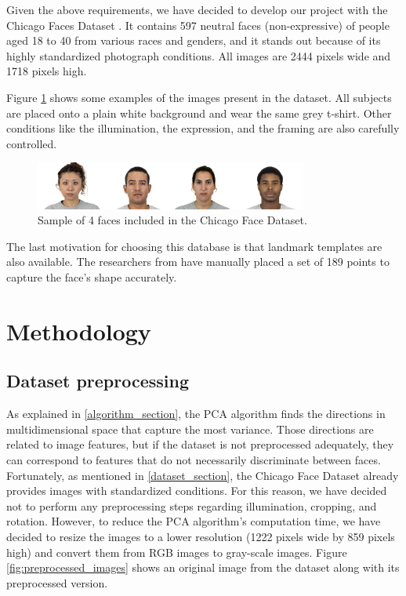 \documentclass{article}
\begin{document}
Given the above requirements, we have decided to develop our project with the Chicago Faces Dataset \cite{debbie-2015}. It contains 597 neutral faces (non-expressive) of people aged 18 to 40 from various races and genders, and it stands out because of its highly standardized photograph conditions. All images are 2444 pixels wide and 1718 pixels high.

Figure \ref{fig:cfd} shows some examples of the images present in the dataset. All subjects are placed onto a plain white background and wear the same grey t-shirt. Other conditions like the illumination, the expression, and the framing are also carefully controlled.

\begin{figure}[H]
    \centering
    \vspace{0in}
    \includegraphics[width=0.8\textwidth]{images/cfd.jpg}
    \caption{Sample of 4 faces included in the Chicago Face Dataset.}
    \label{fig:cfd}
\end{figure}

The last motivation for choosing this database is that landmark templates are also available. The researchers from \cite{singh-2022} have manually placed a set of 189 points to capture the face's shape accurately.


\section{Methodology}

\subsection{Dataset preprocessing}

As explained in \ref{algorithm_section}, the PCA algorithm finds the directions in multidimensional space that capture the most variance. Those directions are related to image features, but if the dataset is not preprocessed adequately, they can correspond to features that do not necessarily discriminate between faces. Fortunately, as mentioned in \ref{dataset_section}, the Chicago Face Dataset already provides images with standardized conditions. For this reason, we have decided not to perform any preprocessing steps regarding illumination, cropping, and rotation. However, to reduce the PCA algorithm's computation time, we have decided to resize the images to a lower resolution (1222 pixels wide by 859 pixels high) and convert them from RGB images to gray-scale images. Figure \ref{fig:preprocessed_images} shows an original image from the dataset along with its preprocessed version.
\end{document}
